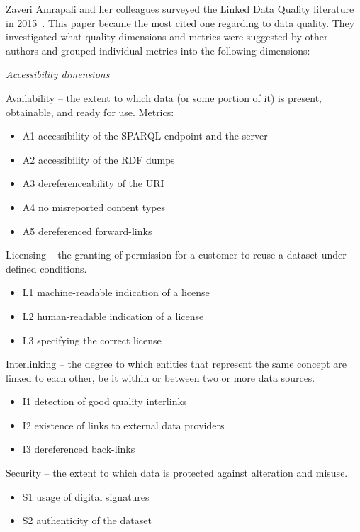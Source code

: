 Zaveri Amrapali and her colleagues surveyed the Linked Data Quality literature in 2015~\cite{zaveri2015}. This paper became the most cited one regarding to data quality. They investigated what quality dimensions and metrics were suggested by other authors and grouped individual metrics into the following dimensions:

\emph{Accessibility dimensions}

Availability -- the extent to which data (or some portion of it) is present, obtainable, and ready for use. Metrics:
\begin{itemize}
 \setlength{\parskip}{0pt}
 \setlength{\itemsep}{0pt plus 1pt}
 \item A1 accessibility of the SPARQL endpoint and the server
 \item A2 accessibility of the RDF dumps
 \item A3 dereferenceability of the URI
 \item A4 no misreported content types
 \item A5 dereferenced forward-links
\end{itemize}

Licensing -- the granting of permission for a customer to reuse a dataset under defined conditions.
\begin{itemize}
 \setlength{\parskip}{0pt}
 \setlength{\itemsep}{0pt plus 1pt}
 \item L1 machine-readable indication of a license
 \item L2 human-readable indication of a license
 \item L3 specifying the correct license
\end{itemize}

Interlinking -- the degree to which entities that represent the same concept are linked to each other, be it within or between two or more data sources.
\begin{itemize}
 \setlength{\parskip}{0pt}
 \setlength{\itemsep}{0pt plus 1pt}
 \item I1 detection of good quality interlinks
 \item I2 existence of links to external data providers
 \item I3 dereferenced back-links
\end{itemize}

Security -- the extent to which data is protected against alteration and misuse.
\begin{itemize}
 \setlength{\parskip}{0pt}
 \setlength{\itemsep}{0pt plus 1pt}
 \item S1 usage of digital signatures
 \item S2 authenticity of the dataset
\end{itemize}

